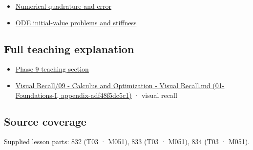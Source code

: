 \begin{itemize}
\tightlist
\item
  \hyperref[appendix-80521eae6b71]{Numerical quadrature and error}
\item
  \hyperref[appendix-e8ab9836882e]{ODE initial-value problems and stiffness}
\end{itemize}

\subsection{Full teaching explanation}\label{full-teaching-explanation}

\begin{itemize}
\tightlist
\item
  \href{Continuous\%20Notes/Computing\%20Foundations\%20-\%20From\%20Bits\%20to\%20C++\%20and\%20Systems\%20APIs\#Integration\%20and\%20quadrature}{Phase 9 teaching section}
\item
  \href{}{Visual Recall/09 - Calculus and Optimization - Visual Recall.md (01-Foundations-I, appendix-adf48f5dc5c1)} · visual recall
\end{itemize}

\subsection{Source coverage}\label{source-coverage}

Supplied lesson parts: 832 (T03 · M051), 833 (T03 · M051), 834 (T03 · M051).
